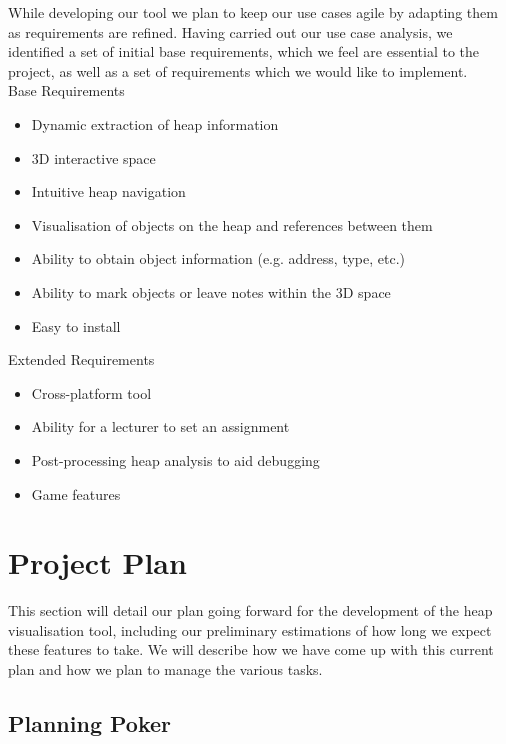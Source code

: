 \documentclass[10pt, a4paper]{article}
\begin{document}
While developing our tool we plan to keep our use cases agile by adapting them as requirements are refined. Having carried out our use case analysis, we identified a set of initial base requirements, which we feel are essential to the project, as well as a set of requirements which we would like to implement.
\\

\noindent Base Requirements
\begin{itemize}

  \item Dynamic extraction of heap information
  \item 3D interactive space
  \item Intuitive heap navigation
  \item Visualisation of objects on the heap and references between them
  \item Ability to obtain object information (e.g. address, type, etc.) 
  \item Ability to mark objects or leave notes within the 3D space
  \item Easy to install

\end{itemize}

\noindent Extended Requirements
\begin{itemize}

  \item Cross-platform tool
  \item Ability for a lecturer to set an assignment
  \item Post-processing heap analysis to aid debugging
  \item Game features

\end{itemize}

\section{Project Plan}

This section will detail our plan going forward for the development of the heap visualisation tool, including our preliminary estimations of how long we expect these features to take. We will describe how we have come up with this current plan and how we plan to manage the various tasks. 

\subsection{Planning Poker}
\end{document}
